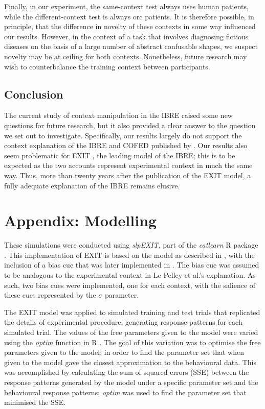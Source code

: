 \documentclass[twocolumn]{article}
\begin{document}
{Finally, in our experiment, the same-context test always uses human patients, while the different-context test is always orc patients. It is therefore possible, in principle, that the difference in novelty of these contexts in some way influenced our results. However, in the context of a task that involves diagnosing fictious diseases on the basis of a large number of abstract confusable shapes, we suspect novelty may be at ceiling for both contexts. Nonetheless, future research may wish to counterbalance the training context between participants. 



\subsection{Conclusion}

The current study of context manipulation in the IBRE raised some new questions for future research, but it also provided a clear answer to the question we set out to investigate. Specifically, our results largely do not support the context explanation of the IBRE and COFED published by \cite{LePelley2016}. Our results also seem problematic for EXIT \citep{Kruschke2001b}, the leading model of the IBRE; this is to be expected as the two accounts represent experimental context in much the same way. Thus, more than twenty years after the publication of the EXIT model, a fully adequate explanation of the IBRE remains elusive.

\setlength{\bibhang}{15pt}





\section*{Appendix: Modelling}

These simulations were conducted using \emph{slpEXIT}, part of the \emph{catlearn} R package \citep{catlearn2019}. This implementation of EXIT is based on the model as described in \cite{Kruschke2001b}, with the inclusion of a bias cue that was later implemented in \cite{Kruschke2003}. The bias cue was assumed to be analogous to the experimental context in Le Pelley et al.'s explanation. As such, two bias cues were implemented, one for each context, with the salience of these cues represented by the $\sigma$ parameter. 

The EXIT model was applied to simulated training and test trials that replicated the details of experimental procedure, generating response patterns for each simulated trial. The values of the free parameters given to the model were varied using the \emph{optim} function in R \citep{R2018}. The goal of this variation was to optimise the free parameters given to the model; in order to find the parameter set that when given to the model gave the closest approximation to the behavioural data. This was accomplished by calculating the sum of squared errors (SSE) between the response patterns generated by the model under a specific parameter set and the behavioural response patterns; \emph{optim} was used to find the parameter set that minimised the SSE.

}
\end{document}
